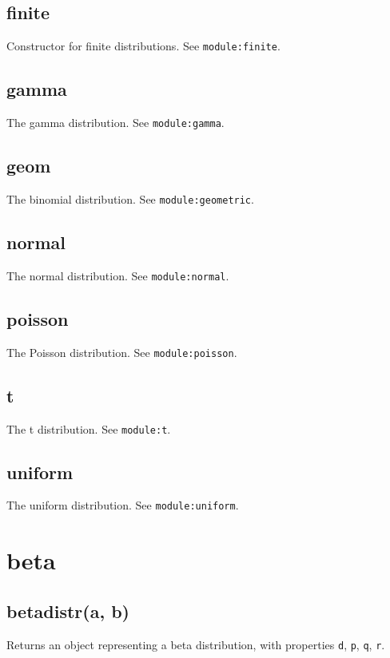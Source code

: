 \documentclass{article}
\begin{document}
    \subsection*{finite}
    Constructor for finite distributions. See \texttt{module:finite}.


    \subsection*{gamma}
    The gamma distribution. See \texttt{module:gamma}.


    \subsection*{geom}
    The binomial distribution. See \texttt{module:geometric}.


    \subsection*{normal}
    The normal distribution. See \texttt{module:normal}.


    \subsection*{poisson}
    The Poisson distribution. See \texttt{module:poisson}.


    \subsection*{t}
    The t distribution. See \texttt{module:t}.


    \subsection*{uniform}
    The uniform distribution. See \texttt{module:uniform}.


  \section{beta}
    \subsection*{betadistr(a, b)}
    Returns an object representing a beta distribution, with properties \texttt{d}, \texttt{p}, \texttt{q}, \texttt{r}.
\end{document}
